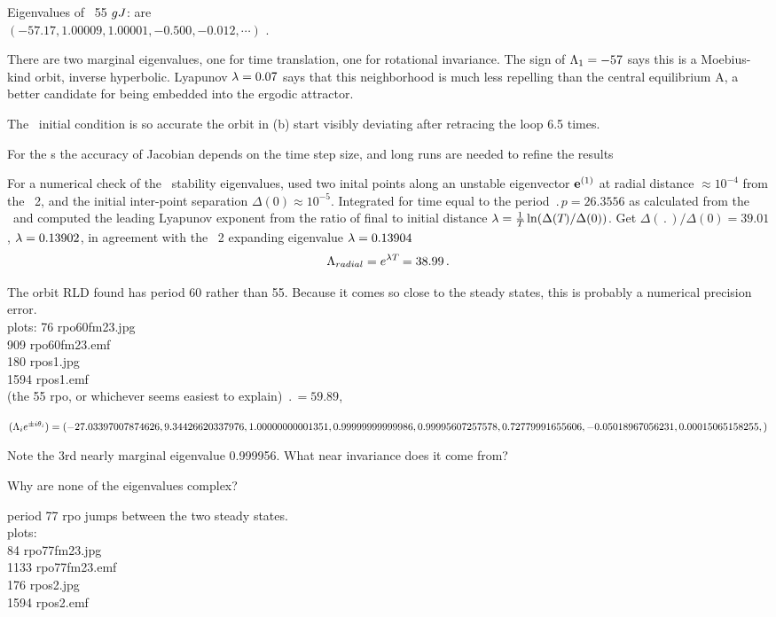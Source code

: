 Eigenvalues of \rpo\ {\nameit}55 $g{J}$: are
\\
$(-57.17,  1.00009, 1.00001, -0.500, -0.012, \cdots)$ .
%

There are two
marginal eigenvalues, one for time translation, one for
rotational invariance. 
The sign of $\Lambda_{1}=-57$ says this is a Moebius-kind orbit,
inverse hyperbolic.
Lyapunov $\lambda=0.07$ says that this neighborhood is much less repelling than
the central equilibrium A, a better candidate for being embedded into the
ergodic attractor.

The \rpo\ initial condition is
so accurate the orbit in (b)
start visibly deviating after retracing the loop 6.5 times.

For the \rpo s the accuracy of Jacobian depends
on the time step size, and long runs are needed to refine the results

For a numerical check of the \rpo\ stability eigenvalues,
used two inital
points along an unstable eigenvector ${\bf e}^{(1)}$
at radial distance  $\approx 10^{-4}$ from the \eqv\ {\nameit}2,
and the initial inter-point separation $\Delta(0) \approx 10^{-5}$.
Integrated for time equal to the period $\period{p}=26.3556$ as calculated from
the \jacobianM\ and computed the leading Lyapunov exponent from the ratio of
final to initial distance 
$\lambda= {1 \over {T_{}}}\ln( \Delta({T_{}})/\Delta(0))$.
Get
$\Delta(\period{})/\Delta(0) =39.01$,
$\lambda=0.13902$, in agreement with the \eqv\ {\nameit}2 
expanding eigenvalue $\lambda=0.13904$
\[
\Lambda_{radial} =  e^{\lambda {T_{}}} =38.99
\,.
\]

The orbit RLD found has period 60 
rather than 55.  Because it comes so close to the steady states, 
this is probably a numerical precision error.
\\
plots:
  76 rpo60fm23.jpg	\\
 909 rpo60fm23.emf	\\
 180 rpos1.jpg	\\
1594 rpos1.emf	\\


(the 55 rpo, or whichever seems easiest to explain)
$\period{} = 59.89$,

$(\Lambda_i e^{\pm i\theta_i})=
(
 -27.03397007874626,
   9.34426620337976,
   1.00000000001351,
   0.99999999999986,
   0.99995607257578,
   0.72779991655606,
  -0.05018967056231,
   0.00015065158255,
)$

Note the 3rd nearly marginal eigenvalue 0.999956. What near
invariance does it come from? 

Why are none of the eigenvalues complex?

period 77 rpo jumps between the two steady states.
\\
plots:	\\
  84 rpo77fm23.jpg	\\
1133 rpo77fm23.emf	\\
 176 rpos2.jpg	\\
1594 rpos2.emf	\\

